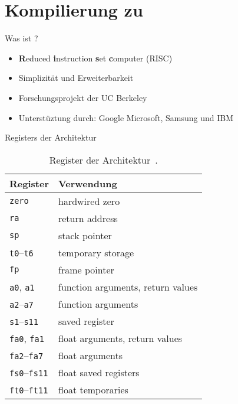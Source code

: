 \section{Kompilierung zu \riscv}
\begin{frame}{Was ist \riscv?}
	\begin{itemize}
        \item \textbf{R}educed \textbf{i}nstruction \textbf{s}et \textbf{c}omputer (RISC)
        \item Simplizität und Erweiterbarkeit
        \item Forschungsprojekt der UC Berkeley
        \item Unterstüztung durch: Google Microsoft, Samsung und IBM
	\end{itemize}
\end{frame}

\begin{frame}{Registers der \riscv{} Architektur }
	\begin{table}
		\centering
		\caption[Registers der \riscv{} Architektur.]{Register der \riscv{} Architektur~\cite[p.~155]{Waterman2019}.}\label{tbl:riscv_regs}
		\begin{tabularx}{\linewidth}{l|L}
			 Register & Verwendung                        \\ \hline
			\texttt{zero}               & hardwired zero                    \\ \hline
			\texttt{ra}                 & return address                    \\ \hline
			\texttt{sp}                 & stack pointer                     \\ \hline
			\texttt{t0}--\texttt{t6}    & temporary storage                 \\ \hline
			\texttt{fp}                 & frame pointer                     \\ \hline
			\texttt{a0}, \texttt{a1}    & function arguments, return values \\ \hline
			\texttt{a2}--\texttt{a7}    & function arguments                \\ \hline
			\texttt{s1}--\texttt{s11}   & saved register                    \\ \hline
			\texttt{fa0}, \texttt{fa1}  & float arguments, return values    \\ \hline
			\texttt{fa2}--\texttt{fa7}  & float arguments                   \\ \hline
			\texttt{fs0}--\texttt{fs11} & float saved registers             \\ \hline
			\texttt{ft0}--\texttt{ft11} & float temporaries                 \\
		\end{tabularx}
	\end{table}
\end{frame}

